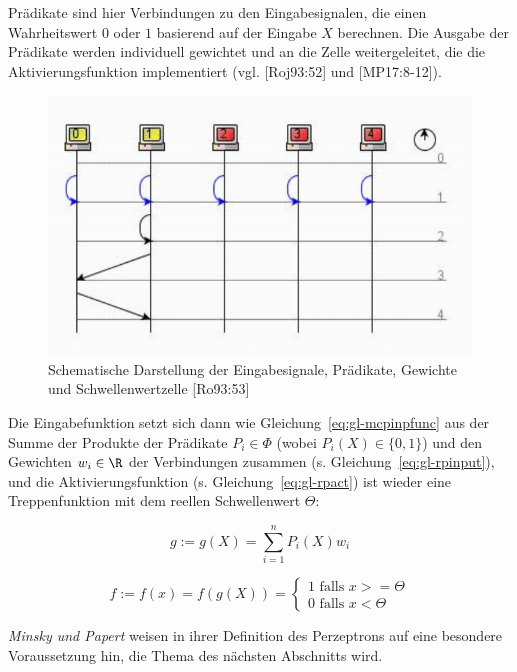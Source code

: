 Prädikate sind hier Verbindungen zu den Eingabesignalen, die einen Wahrheitswert $0$ oder $1$ basierend auf der Eingabe $X$ berechnen.
Die Ausgabe der Prädikate werden individuell gewichtet und an die Zelle weitergeleitet, die die Aktivierungsfunktion implementiert (vgl. [Roj93:52] und [MP17:8-12]).


\begin{figure}[h]
    \centering
    \includegraphics{images/p1ReadSeq.pdf}
    \caption{Schematische Darstellung der Eingabesignale, Prädikate, Gewichte und Schwellenwertzelle [Ro93:53]}
    \label{fig-perctheda}
\end{figure}


Die Eingabefunktion setzt sich dann wie Gleichung~\ref{eq:gl-mcpinpfunc} aus der Summe der Produkte der Prädikate $P_i \in \Phi$ (wobei $P_i(X) \in \{0, 1\}$) und den Gewichten $w_i \in \R$ der Verbindungen zusammen (s. Gleichung~\ref{eq:gl-rpinput}), und die Aktivierungsfunktion (s. Gleichung~\ref{eq:gl-rpact}) ist wieder eine Treppenfunktion mit dem reellen Schwellenwert $\Theta$:

\begin{equation}
g:= g(X) = \sum^n_{i=1} P_i(X) w_i
\label{eq:gl-rpinput}
\end{equation}

\begin{equation}
    f:= f(x) = f(g(X)) = \begin{cases}
                          1 \text{ falls } x >= \Theta \\
                          0 \text{ falls } x < \Theta
\end{cases}
\label{eq:gl-rpact}
\end{equation}

\noindent
\textit{Minsky und Papert} weisen in ihrer Definition des Perzeptrons auf eine besondere Voraussetzung hin, die Thema des nächsten Abschnitts wird.

